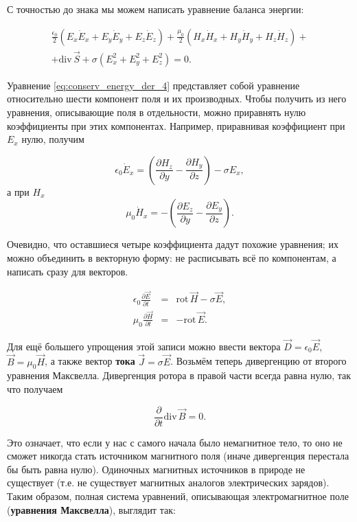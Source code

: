 \documentclass[11pt,a4paper]{article}
\numberwithin{equation}{section}
\newcommand{\nn}{\nonumber}
\newcommand{\pt}{\partial}
\newcommand{\rot}{\mathrm{rot}\,}
\renewcommand{\div}{\mathrm{div}\,}
\newcommand{\eps}{\epsilon}
\begin{document}
С точностью до знака мы можем написать уравнение баланса энергии: 

\begin{eqnarray}
  \label{eq:conserv_energy_der_4}
\nn
  \frac{\eps_0}{2} \left(E_x \dot{E}_x + E_y \dot{E}_y +
    E_z \dot{E}_z \right) +   \frac{\mu_0}{2} \left(H_x \dot{H}_x + H_y \dot{H}_y +
    H_z \dot{H}_z \right) + \\
+ \div \vec{S} + \sigma \left(E_x^2 + E_y^2 +E_z^2 \right) =0.
\end{eqnarray}

Уравнение \eqref{eq:conserv_energy_der_4} представляет собой уравнение
относительно шести компонент поля и их производных. Чтобы получить из
него уравнения, описывающие поля в отдельности, можно приравнять нулю
коэффициенты при этих компонентах. Например, приравнивая коэффициент
при $E_x$ нулю, получим

\begin{equation}
  \label{eq:conserv_energy_der_5}
  \eps_0 \dot{E}_x = \left( \frac{\pt H_z}{\pt y} - \frac{\pt H_y}{\pt
      z}\right) - \sigma E_x,
\end{equation}
а при $H_x$ 
\begin{equation}
  \label{eq:conserv_energy_der_5}
  \mu_0 \dot{H}_x = -\left( \frac{\pt E_z}{\pt y} - \frac{\pt
      E_y}{\pt z}\right).
\end{equation}

Очевидно, что оставшиеся четыре коэффициента дадут похожие уравнения;
их можно объединить в векторную форму: не расписывать всё по
компонентам, а написать сразу для векторов.

\begin{eqnarray}
  \label{eq:maxwell_half}
\nn
  \eps_0 \frac{\pt \vec{E}}{\pt t} &=& \rot \vec{H} - \sigma
  \vec{E},\\
  \mu_0 \frac{\pt \vec{H}}{\pt t} &=& -\rot \vec{E}.
\end{eqnarray}

Для ещё большего упрощения этой записи можно ввести вектора $\vec{D} =
\eps_0 \vec{E}$, $\vec{B} = \mu_0 \vec{H}$, а также вектор
\textbf{тока} $\vec{J} = \sigma \vec{E}$. Возьмём теперь дивергенцию
от второго уравнения Максвелла. Дивергенция ротора в правой части
всегда равна нулю, так что получаем

\begin{equation}
  \label{eq:gauss_magnet}
  \frac{\pt}{\pt t} \div \vec{B} = 0.
\end{equation}

Это означает, что если у нас с самого начала было немагнитное тело, то
оно не сможет никогда стать источником магнитного поля (иначе
дивергенция перестала бы быть равна нулю). Одиночных магнитных
источников в природе не существует (т.е. не существует магнитных
аналогов электрических зарядов). Таким образом, полная система
уравнений, описывающая электромагнитное поле (\textbf{уравнения
  Максвелла}), выглядит так:
\end{document}
